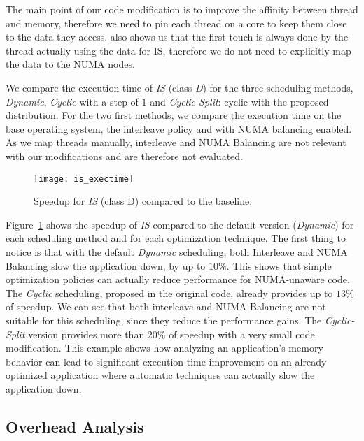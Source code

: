 The main point of our code modification is to improve the affinity between
thread and memory, therefore we need to pin each thread on a core to keep them
close to the data they access. %
\TABARNAC also shows us that the first touch is always done by the thread actually using
the data for IS, therefore we do not need to explicitly map the data to the NUMA nodes.

We compare the execution time of \emph{IS} (class \emph{D}) for the three scheduling
methods, \emph{Dynamic}, \emph{Cyclic} with a step of $1$ and \emph{Cyclic-Split}:
cyclic with the proposed distribution. For the two first methods, we compare the
execution time on the base operating system, the interleave policy and with
NUMA balancing enabled. As we map threads manually, interleave and NUMA
Balancing are not relevant with our modifications and are therefore not evaluated.

\begin{figure}[htb]
    \centering
    \texttt{[image: is\_exectime]}
    \caption{Speedup for \emph{IS} (class D) compared to the baseline.}
\label{fig:is-res}
\end{figure}

Figure~\ref{fig:is-res} shows the speedup of \emph{IS} compared to
the default version (\emph{Dynamic}) for each scheduling method and for each
optimization technique. The first thing to notice is that with the default
\emph{Dynamic} scheduling, both Interleave and NUMA Balancing slow
the application down, by up to $10\%$.
This shows that simple optimization policies can actually reduce performance
for NUMA-unaware code.
The \emph{Cyclic} scheduling, proposed in the original code, already provides up to $13\%$ of
speedup. We can see that both interleave and NUMA Balancing are not suitable
for this scheduling, since they reduce the performance gains.
The \emph{Cyclic-Split} version provides more than $20\%$ of speedup with a very small code
modification.
This example shows how analyzing an application's memory behavior can lead to
significant execution time improvement on an already optimized application where automatic techniques can actually slow
the application down.




\subsection{Overhead Analysis}
\label{sec:expe-overhead}

